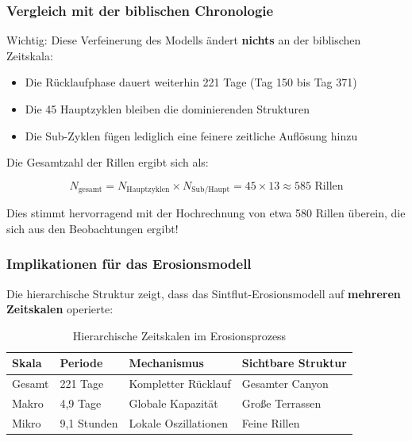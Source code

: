 \subsubsection{Vergleich mit der biblischen Chronologie}

Wichtig: Diese Verfeinerung des Modells ändert \textbf{nichts} an der biblischen Zeitskala:

\begin{itemize}
	\item Die Rücklaufphase dauert weiterhin 221 Tage (Tag 150 bis Tag 371)
	\item Die 45 Hauptzyklen bleiben die dominierenden Strukturen
	\item Die Sub-Zyklen fügen lediglich eine feinere zeitliche Auflösung hinzu
\end{itemize}

Die Gesamtzahl der Rillen ergibt sich als:

\begin{equation}
	N_{\text{gesamt}} = N_{\text{Hauptzyklen}} \times N_{\text{Sub/Haupt}} = 45 \times 13 \approx 585 \text{ Rillen}
\end{equation}

Dies stimmt hervorragend mit der Hochrechnung von etwa 580 Rillen überein, die sich aus den Beobachtungen ergibt!

\subsubsection{Implikationen für das Erosionsmodell}

Die hierarchische Struktur zeigt, dass das Sintflut-Erosionsmodell auf \textbf{mehreren Zeitskalen} operierte:

\begin{table}[h]
	\centering
	\begin{tabular}{|l|l|l|l|}
		\hline
		\textbf{Skala} & \textbf{Periode} & \textbf{Mechanismus} & \textbf{Sichtbare Struktur} \\
		\hline
		Gesamt & 221 Tage & Kompletter Rücklauf & Gesamter Canyon \\
		\hline
		Makro & 4,9 Tage & Globale Kapazität & Große Terrassen \\
		\hline
		Mikro & 9,1 Stunden & Lokale Oszillationen & Feine Rillen \\
		\hline
	\end{tabular}
	\caption{Hierarchische Zeitskalen im Erosionsprozess}
\end{table}

